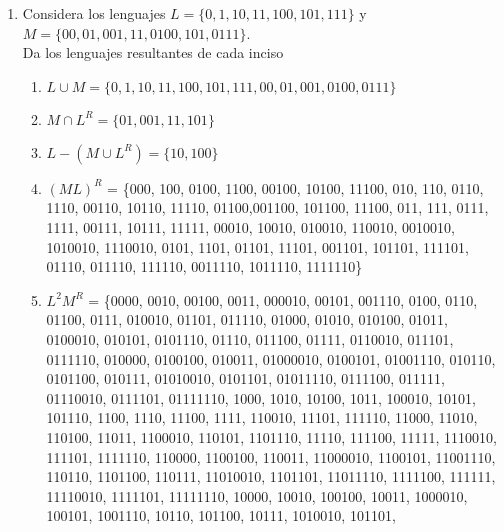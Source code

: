 \documentclass{article}
\begin{document}
\begin{enumerate}
{\begin{enumerate}
            \end{enumerate}
        }
        
        \item {
            Considera los lenguajes $L = \{ 0, 1, 10, 11, 100, 101, 111 \}$ y 
            $M = \{ 00, 01, 001, 11, 0100, 101, 0111 \}$.\\
            Da los lenguajes resultantes de cada inciso
            \begin{enumerate}
                \item {
                    $L \cup M = \{0, 1, 10, 11, 100, 101, 111, 00, 01, 001, 0100, 0111 \}$ 
                }
                \item {
                    $M \cap L^R = \{01, 001, 11, 101 \}$
                }
                \item {
                    $L - (M \cup L^R) = \{10, 100 \}$
                }
                \item {
                    $(ML)^R$ = \{000, 100, 0100, 1100, 00100, 10100, 11100, 010, 
                    110, 0110, 1110, 00110, 10110, 11110, 01100,001100, 101100, 
                    11100, 011, 111, 0111, 1111, 00111, 10111, 11111, 00010, 10010, 
                    010010, 110010, 0010010, 1010010, 1110010, 0101, 1101, 01101, 
                    11101, 001101, 101101, 111101, 01110, 011110, 111110, 0011110, 
                    1011110, 1111110\}
                }
                \item {
                    $L^2M^R$ = \{0000, 0010, 00100, 0011, 000010, 00101, 001110, 
                    0100, 0110, 01100, 0111, 010010, 01101, 011110, 01000, 01010,
                    010100, 01011, 0100010, 010101, 0101110, 01110, 011100, 01111, 
                    0110010, 011101, 0111110, 010000, 0100100, 010011, 01000010, 
                    0100101, 01001110, 010110, 0101100, 010111, 01010010, 0101101, 
                    01011110, 0111100, 011111, 01110010, 0111101, 01111110, 1000, 
                    1010, 10100, 1011, 100010, 10101, 101110, 1100, 1110, 11100, 
                    1111, 110010, 11101, 111110, 11000, 11010, 110100, 11011, 
                    1100010, 110101, 1101110, 11110, 111100, 11111, 1110010, 111101,
                    1111110, 110000, 1100100, 110011, 11000010, 1100101, 11001110, 
                    110110, 1101100, 110111, 11010010, 1101101, 11011110, 1111100, 
                    111111, 11110010, 1111101, 11111110, 10000, 10010, 100100, 10011, 
                    1000010, 100101, 1001110, 10110, 101100, 10111, 1010010, 101101,
}
\end{enumerate}}
\end{enumerate}
\end{document}
